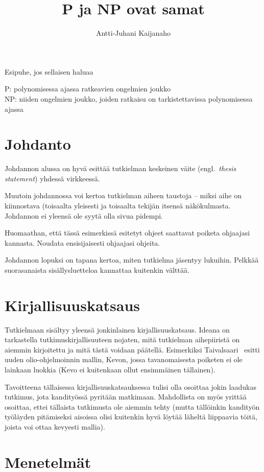 \documentclass[finnish,utf8,kandi]{gradu3}
\title{P ja NP ovat samat}
\author{Antti-Juhani Kaijanaho}
\begin{document}
\preface
Esipuhe, jos sellaisen haluaa

\termlist
P: polynomisessa ajassa ratkeavien ongelmien joukko \\
NP: niiden ongelmien joukko, joiden ratkaisu on tarkistettavissa polynomisessa ajassa

\mainmatter

\section{Johdanto}

Johdannon alussa on hyvä esittää tutkielman keskeinen väite
(engl.~\emph{thesis statement}) yhdessä virkkeessä.

Muutoin johdannossa voi kertoa tutkielman aiheen taustoja -- miksi
aihe on kiinnostava (toisaalta yleisesti ja toisaalta tekijän itsensä
näkökulmasta.  Johdannon ei yleensä ole syytä olla sivua pidempi.

Huomaathan, että tässä esimerkissä esitetyt ohjeet saattavat poiketa
ohjaajasi kannasta.  Noudata ensisijaisesti ohjaajasi ohjeita.

Johdannon lopuksi on tapana kertoa, miten tutkielma jäsentyy lukuihin.
Pelkkää suorasanaista sisällysluetteloa kannattaa kuitenkin välttää.

\section{Kirjallisuuskatsaus}

Tutkielmaan sisältyy yleensä jonkinlainen kirjallisuuskatsaus.  Ideana
on tarkastella tutkimuskirjallisuuteen nojaten, mitä tutkielman
aihepiiristä on aiemmin kirjoitettu ja mitä tästä voidaan päätellä.
Esimerkiksi
Taivalsaari~\cite{taivalsaari93:_critic_view_inher_reusab_objec_progr}
esitti uuden olio-ohjelmoinnin mallin, Kevon, jossa tavanomaisesta
poiketen ei ole lainkaan luokkia (Kevo ei kuitenkaan ollut ensimmäinen
tällainen).

Tavoitteena tällaisessa kirjallisuuskatsauksessa tulisi olla osoittaa
jokin laadukas tutkimus, jota kandityössä pyritään matkimaan.
Mahdollista on myös yrittää osoittaa, ettei tällaista tutkimusta ole
aiemmin tehty (mutta tällöinkin kandityön työläyden pitämiseksi
aisoissa olisi kuitenkin hyvä löytää läheltä liippaavia töitä, joista
voi ottaa kevyesti mallia).

\section{Menetelmät}
\end{document}
